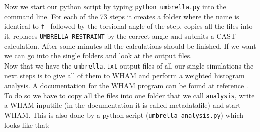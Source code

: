 \documentclass[a4paper,11pt]{scrartcl}
\begin{document}
Now we start our python script by typing \texttt{python umbrella.py} into the command line. For each of the 73 steps it creates a folder where the name is identical to \texttt{f\_} followed by the torsional angle of the step, copies all the files into it, replaces \texttt{UMBRELLA\_RESTRAINT} by the correct angle and submits a CAST calculation. After some minutes all the calculations should be finished. If we want we can go into the single folders and look at the output files.
\\

Now that we have the \texttt{umbrella.txt} output files of all our single simulations the next steps is to give all of them to WHAM and perform a weighted histogram analysis. A documentation for the WHAM program can be found at reference \cite{grossfield_wham_nodate}. To do so we have to copy all the files into one folder that we call \texttt{analysis}, write a WHAM inputfile (in the documentation it is called metadatafile) and start WHAM. This is also done by a python script (\texttt{umbrella\_analysis.py}) which looks like that:
\end{document}
